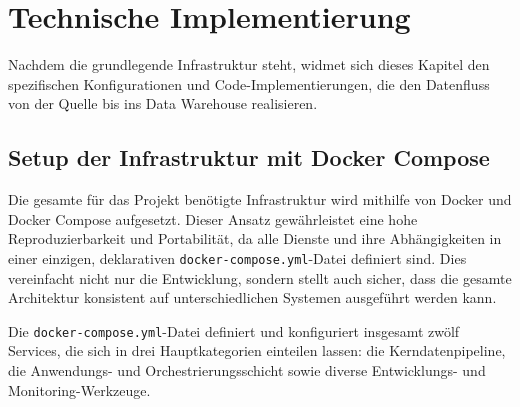 \documentclass[
    12pt,               
    a4paper,        
    ngerman            
]{scrartcl}
\begin{document}
\section{Technische Implementierung}
\label{chap:technische_implementierung}

Nachdem die grundlegende Infrastruktur steht, widmet sich dieses Kapitel den spezifischen Konfigurationen und Code-Implementierungen, die den Datenfluss von der Quelle bis ins Data Warehouse realisieren.

\subsection{Setup der Infrastruktur mit Docker Compose}
\label{sec:docker_compose_setup}

Die gesamte für das Projekt benötigte Infrastruktur wird mithilfe von Docker und Docker Compose aufgesetzt. Dieser Ansatz gewährleistet eine hohe Reproduzierbarkeit und Portabilität, da alle Dienste und ihre Abhängigkeiten in einer einzigen, deklarativen \texttt{docker-compose.yml}-Datei definiert sind. Dies vereinfacht nicht nur die Entwicklung, sondern stellt auch sicher, dass die gesamte Architektur konsistent auf unterschiedlichen Systemen ausgeführt werden kann.

Die \texttt{docker-compose.yml}-Datei definiert und konfiguriert insgesamt zwölf Services, die sich in drei Hauptkategorien einteilen lassen: die Kerndatenpipeline, die Anwendungs- und Orchestrierungsschicht sowie diverse Entwicklungs- und Monitoring-Werkzeuge.
\end{document}
